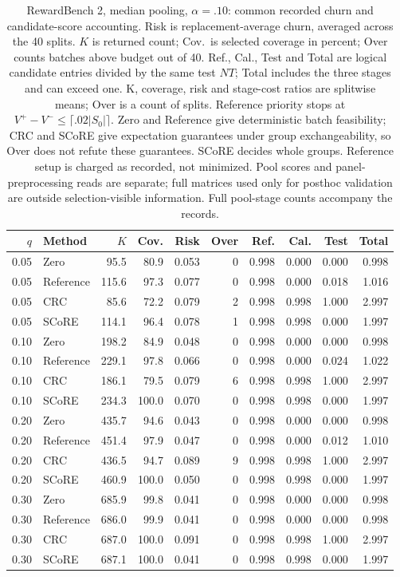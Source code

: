 \begin{table}[t]
\centering\small
\setlength{\tabcolsep}{4pt}
\begin{tabular}{rlrrrrrrrr}
\toprule
$q$ & Method & $K$ & Cov. & Risk & Over & Ref. & Cal. & Test & Total \\
\midrule
0.05 & Zero & 95.5 & 80.9 & 0.053 & 0 & 0.998 & 0.000 & 0.000 & 0.998 \\
0.05 & Reference & 115.6 & 97.3 & 0.077 & 0 & 0.998 & 0.000 & 0.018 & 1.016 \\
0.05 & CRC & 85.6 & 72.2 & 0.079 & 2 & 0.998 & 0.998 & 1.000 & 2.997 \\
0.05 & SCoRE & 114.1 & 96.4 & 0.078 & 1 & 0.998 & 0.998 & 0.000 & 1.997 \\
0.10 & Zero & 198.2 & 84.9 & 0.048 & 0 & 0.998 & 0.000 & 0.000 & 0.998 \\
0.10 & Reference & 229.1 & 97.8 & 0.066 & 0 & 0.998 & 0.000 & 0.024 & 1.022 \\
0.10 & CRC & 186.1 & 79.5 & 0.079 & 6 & 0.998 & 0.998 & 1.000 & 2.997 \\
0.10 & SCoRE & 234.3 & 100.0 & 0.070 & 0 & 0.998 & 0.998 & 0.000 & 1.997 \\
0.20 & Zero & 435.7 & 94.6 & 0.043 & 0 & 0.998 & 0.000 & 0.000 & 0.998 \\
0.20 & Reference & 451.4 & 97.9 & 0.047 & 0 & 0.998 & 0.000 & 0.012 & 1.010 \\
0.20 & CRC & 436.5 & 94.7 & 0.089 & 9 & 0.998 & 0.998 & 1.000 & 2.997 \\
0.20 & SCoRE & 460.9 & 100.0 & 0.050 & 0 & 0.998 & 0.998 & 0.000 & 1.997 \\
0.30 & Zero & 685.9 & 99.8 & 0.041 & 0 & 0.998 & 0.000 & 0.000 & 0.998 \\
0.30 & Reference & 686.0 & 99.9 & 0.041 & 0 & 0.998 & 0.000 & 0.000 & 0.998 \\
0.30 & CRC & 687.0 & 100.0 & 0.091 & 0 & 0.998 & 0.998 & 1.000 & 2.997 \\
0.30 & SCoRE & 687.1 & 100.0 & 0.041 & 0 & 0.998 & 0.998 & 0.000 & 1.997 \\
\bottomrule
\end{tabular}
\caption{RewardBench 2, median pooling, $\alpha=.10$: common recorded churn and candidate-score accounting. Risk is replacement-average churn, averaged across the 40 splits. $K$ is returned count; Cov.\ is selected coverage in percent; Over counts batches above budget out of 40. Ref., Cal., Test and Total are logical candidate entries divided by the same test $NT$; Total includes the three stages and can exceed one. K, coverage, risk and stage-cost ratios are splitwise means; Over is a count of splits. Reference priority stops at $V^+-V^-\le\lceil.02|S_0|\rceil$. Zero and Reference give deterministic batch feasibility; CRC and SCoRE give expectation guarantees under group exchangeability, so Over does not refute these guarantees. SCoRE decides whole groups. Reference setup is charged as recorded, not minimized. Pool scores and panel-preprocessing reads are separate; full matrices used only for posthoc validation are outside selection-visible information. Full pool-stage counts accompany the records.}
\label{tab:common-RewardBench2-median}
\end{table}
